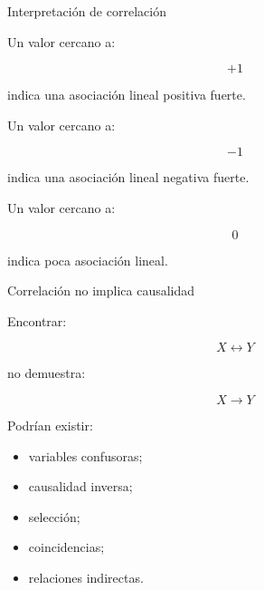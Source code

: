 \documentclass[aspectratio=169,11pt]{beamer}
\begin{document}

\begin{frame}{Interpretación de correlación}

Un valor cercano a:

\[
+1
\]

indica una asociación lineal positiva fuerte.

Un valor cercano a:

\[
-1
\]

indica una asociación lineal negativa fuerte.

Un valor cercano a:

\[
0
\]

indica poca asociación lineal.

\end{frame}


\begin{frame}{Correlación no implica causalidad}

Encontrar:

\[
X
\leftrightarrow
Y
\]

no demuestra:

\[
X
\rightarrow
Y
\]

Podrían existir:

\begin{itemize}

    \item variables confusoras;

    \item causalidad inversa;

    \item selección;

    \item coincidencias;

    \item relaciones indirectas.

\end{itemize}

\end{frame}

\end{document}
